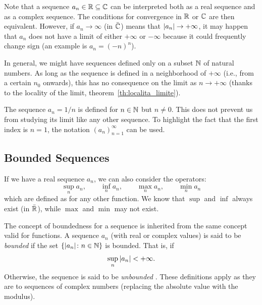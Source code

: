 Note that a sequence $a_n\in {\mathbb R} \subseteq {\mathbb C}$ can be interpreted both as a real
sequence and as a complex sequence. The conditions for convergence in ${\mathbb R}$ or
${\mathbb C}$ are then equivalent. However, if $a_n \to \infty$ (in $\bar {{\mathbb C}}$) means
that ${\left|a_n\right|}\to +\infty$, it may happen that $a_n$ does not have a limit of
either $+\infty$ or $-\infty$ because it could frequently change sign (an
example is $a_n = (-n)^n$).

In general, we might have sequences defined only on a subset ${\mathbb N}$ of natural
numbers. As long as the sequence is defined in a neighborhood of $+\infty$
(i.e., from a certain $n_0$ onwards), this has no consequence on the limit as
$n\to +\infty$ (thanks to the locality of the limit,
theorem~\ref{th:localita_limite}).

\begin{example}
  The sequence $a_n = 1/n$ is defined for $n\in {\mathbb N}$ but $n\neq 0$.
    This does not prevent us from studying its limit like any other sequence. To
  highlight the fact that the first index is $n=1$, the notation
  $(a_n)_{n=1}^\infty$ can be used.
\end{example}
 
\subsection{Bounded Sequences}
\label{sec:successione_limitata}%

If we have a real sequence $a_n$, we can also consider the operators:
\[
  \sup_n a_n, \qquad 
  \inf_n a_n, \qquad 
  \max_n a_n, \qquad 
  \min_n a_n 
\]
which are defined as for any other function. 
We know that $\sup$ and $\inf$ always exist (in $\bar{{\mathbb R}}$), while $\max$ and
$\min$ may not exist.

The concept of boundedness for a sequence is inherited from the same concept
valid for functions.
A sequence $a_n$ (with real or complex values) is said to be 
\emph{bounded}%
%
 if 
the set $\{{\left|a_n\right|}\colon n \in {\mathbb N}\}$ is bounded. That is, if 
\[
\sup_n {\left|a_n\right|} < +\infty.  
\]
Otherwise, the sequence is said to be \emph{unbounded}%
%
.
These definitions apply as they are to sequences of complex numbers (replacing
the absolute value with the modulus).

